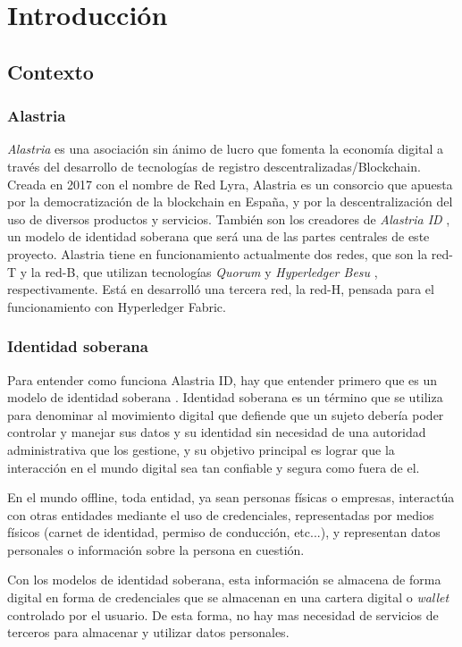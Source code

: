 \chapter{Introducción}
\section{Contexto}

\subsection{Alastria}
\textit{Alastria} \cite{alastria} es una asociación sin ánimo de lucro que fomenta la economía digital a través del desarrollo de tecnologías de registro descentralizadas/Blockchain. 
Creada en 2017 con el nombre de Red Lyra, Alastria es un consorcio que apuesta por la democratización de la blockchain en España, y por la descentralización del uso de diversos productos y servicios.
También son los creadores de \textit{Alastria ID} \cite{alastria-id}, un modelo de identidad soberana que será una de las partes centrales de este proyecto. Alastria tiene en funcionamiento actualmente dos redes, que son la red-T y la red-B, que utilizan tecnologías \textit{Quorum} \cite{quorum} y \textit{Hyperledger Besu} \cite{besu}, respectivamente. Está en desarrolló una tercera red, la red-H, pensada para el funcionamiento con Hyperledger Fabric.

\subsection{Identidad soberana}
Para entender como funciona Alastria ID, hay que entender primero que es un modelo de identidad soberana \cite{ssi}\cite{multi-ssi}.
Identidad soberana es un término que se utiliza para denominar al movimiento digital que defiende que un sujeto debería poder controlar y manejar sus datos y su identidad sin necesidad de una autoridad administrativa que los gestione, y su objetivo principal es lograr que la interacción en el mundo digital sea tan confiable y segura como fuera de el.

En el mundo offline, toda entidad, ya sean personas físicas o empresas, interactúa con otras entidades mediante el uso de credenciales, representadas por medios físicos (carnet de identidad, permiso de conducción, etc...), y representan datos personales o información sobre la persona en cuestión.

Con los modelos de identidad soberana, esta información se almacena de forma digital en forma de credenciales que se almacenan en una cartera digital o \textit{wallet} controlado por el usuario. De esta forma, no hay mas necesidad de servicios de terceros para almacenar y utilizar datos personales.

